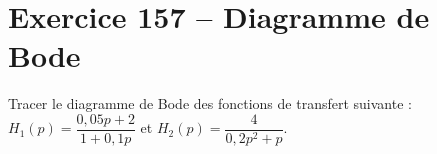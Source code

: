 \section*{Exercice 157 -- Diagramme de Bode}


\setcounter{exo}{0}

Tracer le diagramme de Bode des fonctions de transfert suivante : $H_1(p)=\dfrac{0,05p+2}{1+0,1p}$ et $H_2(p)=\dfrac{4}{0,2p^2+p}$.